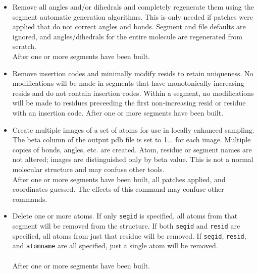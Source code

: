 \begin{itemize}
\item {}
{Remove all angles and/or dihedrals and completely regenerate them using
the segment automatic generation algorithms.  This is only needed if
patches were applied that do not correct angles and bonds.  Segment and
file defaults are ignored, and angles/dihedrals for the entire molecule
are regenerated from scratch.}
{\\
}
{After one or more segments have been built.}

\item {}
{Remove insertion codes and minimally modify resids to retain uniqueness.
No modifications will be made in segments that have monotonically increasing resids
and do not contain insertion codes.
Within a segment, no modifications will be made to residues preceeding the
first non-increasing resid or residue with an insertion code.}
{}
{After one or more segments have been built.}

\item {}
{Create multiple images of a set of atoms for use in locally enhanced sampling.  The beta column of the output pdb file is set to 1... for each image.  Multiple copies of bonds, angles, etc. are created.  Atom, residue or segment names are not altered; images are distinguished only by beta value.  This is not a normal molecular structure and may confuse other tools.}
{\\
}
{After one or more segments have been built, all patches applied, and coordinates guessed.  The effects of this command may confuse other commands.}

\item {}
{Delete one or more atoms.  If only {\tt segid} is specified, all atoms from
that segment will be removed from the structure.  If both {\tt segid} and
{\tt resid} are specified, all atoms from just that residue will be removed.
If {\tt segid}, {\tt resid}, and {\tt atomname} are all specified, just a
single atom will be removed.}
{\\
\\
}
{After one or more segments have been built.}


\end{itemize}

